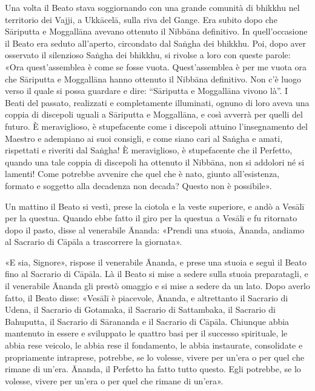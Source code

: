 

Una volta il Beato stava soggiornando con una grande comunità di bhikkhu
nel territorio dei Vajji, a Ukkācelā, sulla riva del Gange. Era subito
dopo che Sāriputta e Moggallāna avevano ottenuto il Nibbāna definitivo.
In quell’occasione il Beato era seduto all’aperto, circondato dal Saṅgha
dei bhikkhu. Poi, dopo aver osservato il silenzioso Saṅgha dei bhikkhu,
si rivolse a loro con queste parole: «Ora quest’assemblea è come se
fosse vuota. Quest’assemblea è per me vuota ora che Sāriputta e
Moggallāna hanno ottenuto il Nibbāna definitivo. Non c’è luogo verso il
quale si possa guardare e dire: “Sāriputta e Moggallāna vivono là”. I
Beati del passato, realizzati e completamente illuminati, ognuno di loro
aveva una coppia di discepoli uguali a Sāriputta e Moggallāna, e così
avverrà per quelli del futuro. È meraviglioso, è stupefacente come i
discepoli attuino l’insegnamento del Maestro e adempiano ai suoi
consigli, e come siano cari al Saṅgha e amati, rispettati e riveriti dal
Saṅgha! È meraviglioso, è stupefacente che il Perfetto, quando una tale
coppia di discepoli ha ottenuto il Nibbāna, non si addolori né si
lamenti! Come potrebbe avvenire che quel che è nato, giunto
all’esistenza, formato e soggetto alla decadenza non decada? Questo non
è possibile».




Un mattino il Beato si vestì, prese la ciotola e la veste superiore, e
andò a Vesālī per la questua. Quando ebbe fatto il giro per la questua a
Vesālī e fu ritornato dopo il pasto, disse al venerabile Ānanda: «Prendi
una stuoia, Ānanda, andiamo al Sacrario di Cāpāla a trascorrere la
giornata».


«E sia, Signore», rispose il venerabile Ānanda, e prese una stuoia e
seguì il Beato fino al Sacrario di Cāpāla. Là il Beato si mise a sedere
sulla stuoia preparatagli, e il venerabile Ānanda gli prestò omaggio e
si mise a sedere da un lato. Dopo averlo fatto, il Beato disse: «Vesālī
è piacevole, Ānanda, e altrettanto il Sacrario di Udena, il Sacrario di
Gotamaka, il Sacrario di Sattambaka, il Sacrario di Bahuputta, il
Sacrario di Sārananda e il Sacrario di Cāpāla. Chiunque abbia mantenuto
in essere e sviluppato le quattro basi per il successo spirituale, le
abbia rese veicolo, le abbia rese il fondamento, le abbia instaurate,
consolidate e propriamente intraprese, potrebbe, se lo volesse, vivere
per un’era o per quel che rimane di un’era. Ānanda, il Perfetto ha fatto
tutto questo. Egli potrebbe, se lo volesse, vivere per un’era o per quel
che rimane di un’era».


